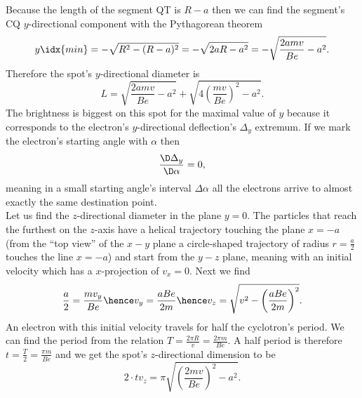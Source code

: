 \documentclass[11pt]{article}
\begin{document}
{\begin{center}
\end{center}
Because the length of the segment QT is $R-a$ then we can find the segment’s CQ $y$-directional component with the Pythagorean theorem
$$y\idx{min}=-\sqrt{R^2-(R-a)^2} = -\sqrt{2aR-a^2}=-\sqrt{\frac{2amv}{Be}-a^2}.$$
Therefore the spot’s $y$-directional diameter is
$$L=\sqrt{\frac{2amv}{Be}-a^2} + \sqrt{4\left(\frac{mv}{Be}\right)^2-a^2}.$$
The brightness is biggest on this spot for the maximal value of $y$ because it corresponds to the electron’s $y$-directional deflection’s $\Delta_y$ extremum. If we mark the electron’s starting angle with $\alpha$ then 
$$\frac{\D \Delta_y}{\D \alpha}=0,$$
meaning in a small starting angle’s interval $\Delta\alpha$ all the electrons arrive to almost exactly the same destination point.\\
Let us find the $z$-directional diameter in the plane $y=0$. The particles that reach the furthest on the $z$-axis have a helical trajectory touching the plane $x=-a$ (from the “top view” of the $x-y$ plane a circle-shaped trajectory of radius $r=\frac a2$ touches the line $x=-a$) and start from the $y-z$ plane, meaning with an initial velocity which has a $x$-projection of $v_x=0$. Next we find
$$\frac a2=\frac {mv_y}{Be}\hence v_y=\frac{aBe}{2m}\hence v_z=\sqrt{v^2-\left(\frac{aBe}{2m}\right)^2}.$$
An electron with this initial velocity travels for half the cyclotron’s period. We can find the period from the relation $T=\frac{2\pi R}{v} = \frac{2\pi m}{Be}$. A half period is therefore $t=\frac{T}{2}=\frac{\pi m}{Be}$ and we get the spot’s $z$-directional dimension to be 
$$2\cdot tv_z=\pi\sqrt{\left(\frac{2mv}{Be}\right)^2-a^2}.$$
\fi
}
\end{document}
